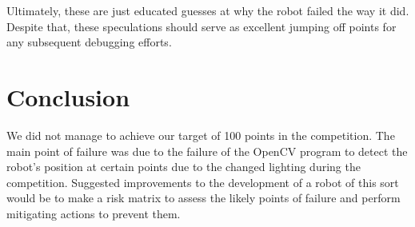 \documentclass{article}
\begin{document}
Ultimately, these are just educated guesses at why the robot failed the way it did. Despite that, these speculations should serve as excellent jumping off points for any subsequent debugging efforts.

\section{Conclusion}
    \quad We did not manage to achieve our target of 100 points in the competition. The main point of failure was due to the failure of the OpenCV program to detect the robot's position at certain points due to the changed lighting during the competition. Suggested improvements to the development of a robot of this sort would be to make a risk matrix to assess the likely points of failure and perform mitigating actions to prevent them.
\end{document}

